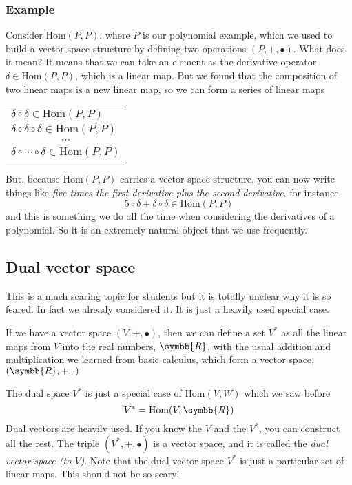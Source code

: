 \subsubsection{Example}
Consider $\text{Hom}(P,P)$, where $P$ is our polynomial example, which we used to build a vector
space structure by defining two operations $(P,+,\vysmblkcircle)$. What does it mean?
It means that we can take an element as the derivative operator $\delta\in\text{Hom}(P,P)$, which
is a linear map. But we found that the composition of two linear maps is a new linear map, so
we can form a series of linear maps
\begin{center}
\begin{tabular}{l}
  $\delta\circ\delta\in\text{Hom}(P,P)$\\
  $\delta\circ\delta\circ\delta\in\text{Hom}(P,P)$\\
  \multicolumn{1}{c}{$\cdots$}\\
  $\delta\circ \cdots \circ\delta\in\text{Hom}(P,P)$
\end{tabular}
\end{center}
But, because $\text{Hom}(P,P)$ carries a vector space structure, you can now write things like
\emph{five times the first derivative plus the second derivative}, for instance
\[
  5\circ \delta + \delta\circ\delta \in\text{Hom}(P,P)
\]
and this is something we do all the time when considering the derivatives of a polynomial.
So it is an extremely natural object that we use frequently.


\subsection{Dual vector space}
This is a much scaring topic for students but it is totally unclear why it is so feared.
In fact we already considered it. It is just a heavily used special case.

If we have a vector space $(V,+,\vysmblkcircle)$, then we can define a set $V^\ast$ as all the
linear maps from $V$ into the real numbers, $\symbb{R}$, with the usual addition and multiplication
we learned from basic calculus, which form a vector space, $(\symbb{R},+,\cdot)$
\begin{center}
\end{center}
The dual space $V^\ast$ is just a special case of $\text{Hom}(V,W)$ which we saw before
\[
  V^\ast = \text{Hom}(V,\symbb{R})
\]
Dual vectors are heavily used. If you know the $V$ and the $V^\ast$, you can construct all the rest.
The triple $(V^\ast,+,\vysmblkcircle)$ is a vector space, and it is called the
\emph{dual vector space (to $V$)}.
Note that the dual vector space $V^\ast$ is just a particular set of linear maps. This should not be
so scary!

